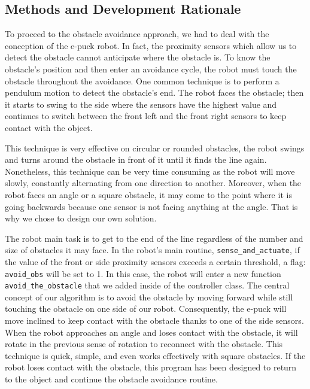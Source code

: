 \documentclass[lettersize,journal]{IEEEtran}
\begin{document}
\subsection{Methods and Development Rationale}
To proceed to the obstacle avoidance approach, we had to deal with the conception of the e-puck robot. In fact, the proximity sensors which allow us to detect the obstacle cannot anticipate where the obstacle is. To know the obstacle's position and then enter an avoidance cycle, the robot must touch the obstacle throughout the avoidance. One common technique is to perform a pendulum motion to detect the obstacle's end. The robot faces the obstacle; then it starts to swing to the side where the sensors have the highest value and continues to switch between the front left and the front right sensors to keep contact with the object. 
\par
This technique is very effective on circular or rounded obstacles, the robot swings and turns around the obstacle in front of it until it finds the line again. Nonetheless, this technique can be very time consuming as the robot will move slowly, constantly alternating from one direction to another. Moreover, when the robot faces an angle or a square obstacle, it may come to the point where it is going backwards because one sensor is not facing anything at the angle. That is why we chose to design our own solution.
\par
The robot main task is to get to the end of the line regardless of the number and size of obstacles it may face.  In the robot's main routine, \texttt{sense\_and\_actuate}, if the value of the front or side proximity sensors exceeds a certain threshold, a flag: \texttt{avoid\_obs} will be set to 1. In this case, the robot will enter a new function \texttt{avoid\_the\_obstacle} that we added inside of the controller class.
The central concept of our algorithm is to avoid the obstacle by moving forward while still touching the obstacle on one side of our robot. Consequently, the e-puck will move inclined to keep contact with the obstacle thanks to one of the side sensors. When the robot approaches an angle and loses contact with the obstacle, it will rotate in the previous sense of rotation to reconnect with the obstacle. This technique is quick, simple, and even works effectively with square obstacles. If the robot loses contact with the obstacle, this program has been designed to return to the object and continue the obstacle avoidance routine.
\end{document}
